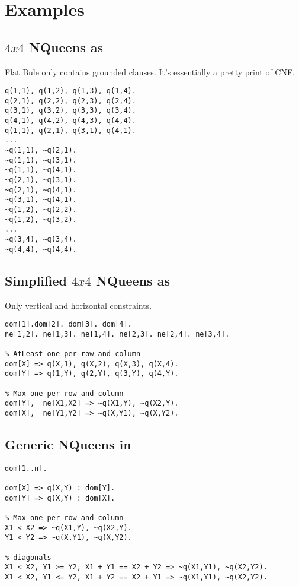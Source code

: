 \documentclass[conference]{IEEEtran}
\begin{document}
\section{Examples}

\subsection{$4x4$ NQueens as \bflat}

Flat Bule only contains grounded clauses. It's essentially a pretty print of CNF.

\begin{lstlisting}
q(1,1), q(1,2), q(1,3), q(1,4).
q(2,1), q(2,2), q(2,3), q(2,4).
q(3,1), q(3,2), q(3,3), q(3,4).
q(4,1), q(4,2), q(4,3), q(4,4).
q(1,1), q(2,1), q(3,1), q(4,1).
...
~q(1,1), ~q(2,1).
~q(1,1), ~q(3,1).
~q(1,1), ~q(4,1).
~q(2,1), ~q(3,1).
~q(2,1), ~q(4,1).
~q(3,1), ~q(4,1).
~q(1,2), ~q(2,2).
~q(1,2), ~q(3,2).
...
~q(3,4), ~q(3,4).
~q(4,4), ~q(4,4).
\end{lstlisting}

\subsection{Simplified $4x4$ NQueens as \bcore}

Only vertical and horizontal constraints.

\begin{lstlisting}
dom[1].dom[2]. dom[3]. dom[4]. 
ne[1,2]. ne[1,3]. ne[1,4]. ne[2,3]. ne[2,4]. ne[3,4].

% AtLeast one per row and column
dom[X] => q(X,1), q(X,2), q(X,3), q(X,4).
dom[Y] => q(1,Y), q(2,Y), q(3,Y), q(4,Y).

% Max one per row and column  
dom[Y],  ne[X1,X2] => ~q(X1,Y), ~q(X2,Y). 
dom[X],  ne[Y1,Y2] => ~q(X,Y1), ~q(X,Y2). 
\end{lstlisting}

\subsection{Generic NQueens in \bfull}

\begin{lstlisting}
dom[1..n]. 

dom[X] => q(X,Y) : dom[Y]. 
dom[Y] => q(X,Y) : dom[X].

% Max one per row and column  
X1 < X2 => ~q(X1,Y), ~q(X2,Y). 
Y1 < Y2 => ~q(X,Y1), ~q(X,Y2). 

% diagonals
X1 < X2, Y1 >= Y2, X1 + Y1 == X2 + Y2 => ~q(X1,Y1), ~q(X2,Y2). 
X1 < X2, Y1 <= Y2, X1 + Y2 == X2 + Y1 => ~q(X1,Y1), ~q(X2,Y2). 
\end{lstlisting}
\end{document}
